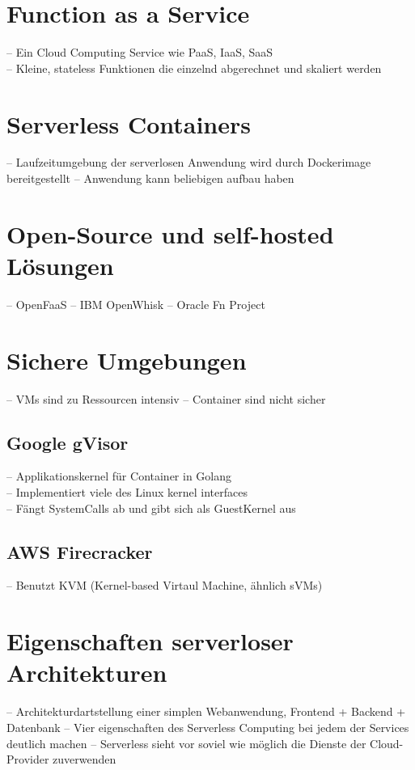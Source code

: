 \section{Function as a Service}
-- Ein Cloud Computing Service wie PaaS, IaaS, SaaS\\
-- Kleine, stateless Funktionen die einzelnd abgerechnet und skaliert werden\\

\section{Serverless Containers}
-- Laufzeitumgebung der serverlosen Anwendung wird durch Dockerimage bereitgestellt
-- Anwendung kann beliebigen aufbau haben

\section{Open-Source und self-hosted Lösungen}
-- OpenFaaS
-- IBM OpenWhisk
-- Oracle Fn Project

\section{Sichere Umgebungen}
-- VMs sind zu Ressourcen intensiv
-- Container sind nicht sicher

\subsection{Google gVisor}
-- Applikationskernel für Container in Golang\\
-- Implementiert viele des Linux kernel interfaces\\
-- Fängt SystemCalls ab und gibt sich als GuestKernel aus\\

\subsection{AWS Firecracker}
-- Benutzt KVM (Kernel-based Virtaul Machine, ähnlich sVMs)\\

\section{Eigenschaften serverloser Architekturen}
-- Architekturdartstellung einer simplen Webanwendung, Frontend + Backend + Datenbank
-- Vier eigenschaften des Serverless Computing bei jedem der Services deutlich machen
-- Serverless sieht vor soviel wie möglich die Dienste der Cloud-Provider zuverwenden